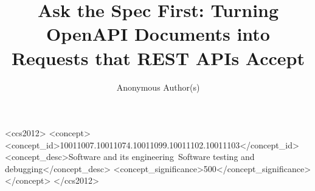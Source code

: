 \documentclass[acmsmall,screen,review,anonymous]{acmart}
\begin{document}
\title[Ask the Spec First]{Ask the Spec First: Turning OpenAPI Documents into Requests that REST APIs Accept}

\author{Anonymous Author(s)}

\begin{abstract}

\end{abstract}

\begin{CCSXML}
<ccs2012>
  <concept>
    <concept_id>10011007.10011074.10011099.10011102.10011103</concept_id>
    <concept_desc>Software and its engineering~Software testing and debugging</concept_desc>
    <concept_significance>500</concept_significance>
  </concept>
</ccs2012>
\end{CCSXML}


\maketitle















\end{document}
